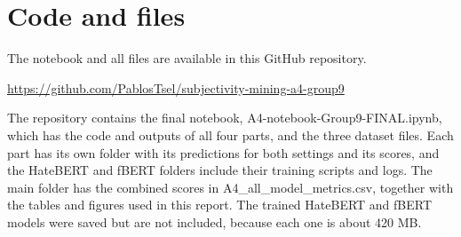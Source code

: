 \documentclass[11pt,a4paper]{article}
\begin{document}
\section{Code and files}

The notebook and all files are available in this GitHub repository.

\begin{center}
\url{https://github.com/PablosTsel/subjectivity-mining-a4-group9}
\end{center}

The repository contains the final notebook, A4-notebook-Group9-FINAL.ipynb, which has the code and outputs of all four parts, and the three dataset files. Each part has its own folder with its predictions for both settings and its scores, and the HateBERT and fBERT folders include their training scripts and logs. The main folder has the combined scores in A4\_all\_model\_metrics.csv, together with the tables and figures used in this report. The trained HateBERT and fBERT models were saved but are not included, because each one is about 420 MB.
\end{document}

